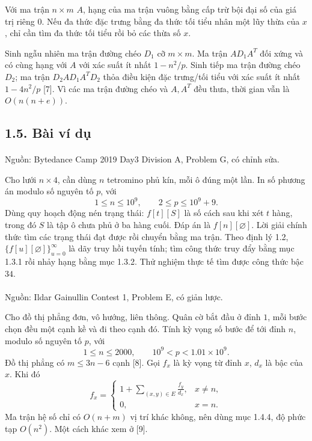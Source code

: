 \documentclass[11pt]{article}
\begin{document}
Với ma trận \(n\times m\) \(A\), hạng của ma trận vuông bằng cấp trừ bội đại
số của giá trị riêng \(0\). Nếu đa thức đặc trưng bằng đa thức tối tiểu nhân
một lũy thừa của \(x\), chỉ cần tìm đa thức tối tiểu rồi bỏ các thừa số \(x\).

Sinh ngẫu nhiên ma trận đường chéo \(D_1\) cỡ \(m\times m\). Ma trận
\(AD_1A^T\) đối xứng và có cùng hạng với \(A\) với xác suất ít nhất
\(1-n^2/p\). Sinh tiếp ma trận đường chéo \(D_2\); ma trận
\(D_2AD_1A^TD_2\) thỏa điều kiện đặc trưng/tối tiểu với xác suất ít nhất
\(1-4n^2/p\) [7]. Vì các ma trận đường chéo và \(A,A^T\) đều thưa, thời gian
vẫn là \(O(n(n+e))\).

\subsection*{1.5. Bài ví dụ}

\paragraph{}
Nguồn: Bytedance Camp 2019 Day3 Division A, Problem G, có chỉnh sửa.

Cho lưới \(n\times4\), cần dùng \(n\) tetromino phủ kín, mỗi ô đúng một lần.
In số phương án modulo số nguyên tố \(p\), với
\[
  1\le n\le10^9,\qquad 2\le p\le10^9+9.
\]
Dùng quy hoạch động nén trạng thái: \(f[t][S]\) là số cách sau khi xét \(t\)
hàng, trong đó \(S\) là tập ô chưa phủ ở ba hàng cuối. Đáp án là
\(f[n][\varnothing]\). Lời giải chính thức tìm các trạng thái đạt được rồi
chuyển bằng ma trận. Theo định lý 1.2,
\(\{f[u][\varnothing]\}_{u=0}^{\infty}\) là dãy truy hồi tuyến tính; tìm công
thức truy đẩy bằng mục 1.3.1 rồi nhảy hạng bằng mục 1.3.2. Thử nghiệm thực tế
tìm được công thức bậc \(34\).

\paragraph{}
Nguồn: Ildar Gainullin Contest 1, Problem E, có giản lược.

Cho đồ thị phẳng đơn, vô hướng, liên thông. Quân cờ bắt đầu ở đỉnh \(1\), mỗi
bước chọn đều một cạnh kề và đi theo cạnh đó. Tính kỳ vọng số bước để tới
đỉnh \(n\), modulo số nguyên tố \(p\), với
\[
  1\le n\le2000,\qquad 10^9<p<1.01\times10^9.
\]
Đồ thị phẳng có \(m\le3n-6\) cạnh [8]. Gọi \(f_x\) là kỳ vọng từ đỉnh \(x\),
\(d_x\) là bậc của \(x\). Khi đó
\[
f_x=\begin{cases}
1+\displaystyle\sum_{(x,y)\in E}\frac{f_y}{d_x},&x\ne n,\\
0,&x=n.
\end{cases}
\]
Ma trận hệ số chỉ có \(O(n+m)\) vị trí khác không, nên dùng mục 1.4.4, độ
phức tạp \(O(n^2)\). Một cách khác xem ở [9].
\end{document}

